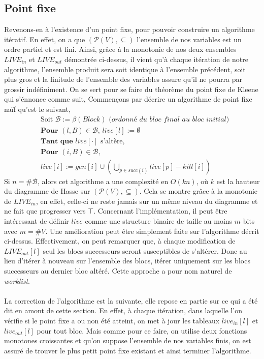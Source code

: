 \subsection{Point fixe}
Revenons-en à l'existence d'un point fixe, pour pouvoir construire un algorithme itératif. En effet,
on a que $(\mathcal{P}(V), \subseteq)$ l'ensemble de nos variables est un ordre partiel et est fini.
Ainsi, grâce à la monotonie de nos deux ensembles $LIVE_{in}$ et $LIVE_{out}$ démontrée ci-dessus, il
vient qu'à chaque itération de notre algorithme, l'ensemble produit sera soit identique à l'ensemble précédent,
soit plus gros et la finitude de l'ensemble des variables assure qu'il ne pourra par grossir indéfiniment. On se sert pour se faire
du théorème du point fixe de Kleene qui s'énnonce comme suit,
\newline
\newline
{}
Commençons par décrire un algorithme de point fixe naïf qu'est le suivant,
\begin{align*}
	&\text{Soit } \mathcal{B} := \beta(Block) \textit{  (ordonné du bloc final au bloc initial)}\\
	&\textbf{Pour } (l, B) \in \mathcal{B}\text{, } live[l] := \emptyset\\
	&\textbf{Tant que }live[\cdot]\text{ s'altère,}\\
	&\textbf{Pour } (i, B) \in \mathcal{B}\text{, }\\
	&live[i] := gen[i] \cup (\bigcup\limits_{p\in succ(i)} live[p] - kill[i])
\end{align*}
Si $n = \#\mathcal{B}$, alors cet algorithme a une complexité en $O(kn)$, où $k$ est la hauteur du diagramme
de Hasse sur $(\mathcal{P}(V), \subseteq)$. Cela se montre grâce à la monotonie de $LIVE_{in}$, en effet, 
celle-ci ne reste jamais sur un même niveau du diagramme et ne fait que progresser vers $\top$.
Concernant l'implémentation, il peut être intéressant de définir $live$ comme une structure binaire de taille au
moins $m$ bits avec $m = \#V$.
Une amélioration peut être simplement faite sur l'algorithme décrit ci-dessus. Effectivement, on peut remarquer que,
à chaque modification de $LIVE_{out}[l]$ seul les blocs successeurs seront susceptibles de s'altérer. Donc
au lieu d'itérer à nouveau sur l'ensemble des blocs, itérer uniquement sur les blocs successeurs au dernier
bloc altéré. Cette approche a pour nom naturel de \textit{worklist}. 
\\
\\
La correction de l'algorithme est la suivante, elle repose en partie sur ce qui a été dit en amont de cette section.
En effet, à chaque itération, dans laquelle l'on vérifie si le point fixe a ou non été atteint, on met à jour les
tableaux $live_{in}[l]$ et $live_{out}[l]$ pour tout bloc. Mais comme pour ce faire, on utilise deux fonctions monotones croissantes et qu'on suppose
l'ensemble de nos variables finis, on est assuré de trouver le plus petit point fixe existant et ainsi terminer l'algorithme.